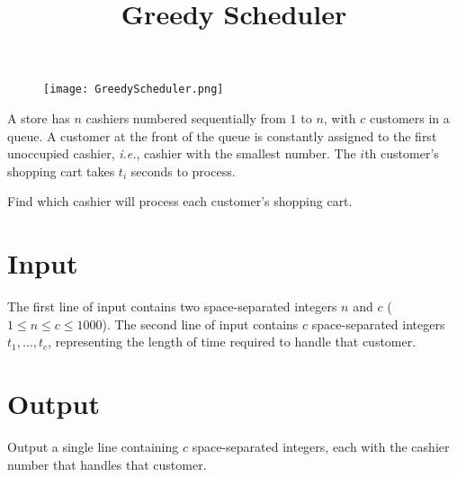 \documentclass{article}
\title{Greedy Scheduler}
\date{}
\begin{document}
\maketitle
\begin{figure}[h!]
\centering
\texttt{[image: GreedyScheduler.png]}
\end{figure}


A store has $n$ cashiers numbered sequentially from $1$ to $n$,
with $c$ customers in a queue. A customer at
the front of the queue is constantly assigned to the first unoccupied
cashier, \emph{i.e.}, cashier with the smallest number.
The $i$th customer's shopping cart takes $t_i$ seconds to
process.

Find which cashier will process each customer's shopping cart.

\section{Input}

The first line of input contains two space-separated integers
$n$ and $c$ ($1\le n\le c\le 1000$).
The second line of input contains $c$ space-separated integers
$t_1, \ldots, t_c$, representing the
length of time required to handle that customer.

\section{Output}

Output a single line containing $c$ space-separated integers,
each with the cashier number that handles that customer.

\end{document}
